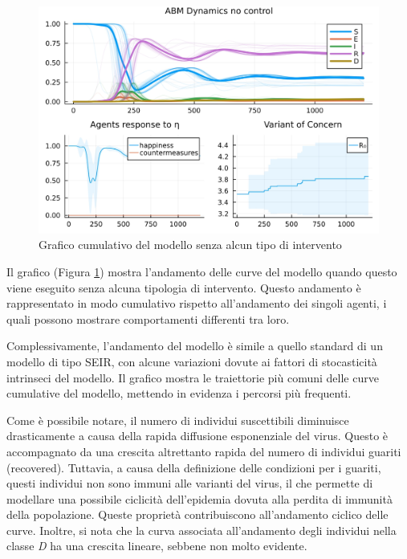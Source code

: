 \begin{figure}[H]
    \begin{center}
		\includegraphics[width=\textwidth]{img/SocialNetworkABM_NO_CONTROL.jpg}
		\caption{Grafico cumulativo del modello senza alcun tipo di intervento}
		\label{fig:abm_no_intervent}
	\end{center}
\end{figure}

Il grafico (Figura \ref{fig:abm_no_intervent}) mostra 
l'andamento delle curve del modello quando questo viene eseguito 
senza alcuna tipologia di intervento. Questo andamento è rappresentato 
in modo cumulativo rispetto all'andamento dei singoli agenti, 
i quali possono mostrare comportamenti differenti tra loro.

Complessivamente, l'andamento del modello è simile a quello 
standard di un modello di tipo SEIR, con alcune variazioni 
dovute ai fattori di stocasticità intrinseci del modello. 
Il grafico mostra le traiettorie più comuni delle curve cumulative 
del modello, mettendo in evidenza i percorsi più frequenti.

Come è possibile notare, il numero di individui suscettibili 
diminuisce drasticamente a causa della rapida diffusione 
esponenziale del virus. Questo è accompagnato da una crescita 
altrettanto rapida del numero di individui guariti (recovered). 
Tuttavia, a causa della definizione delle condizioni per i guariti, 
questi individui non sono immuni alle varianti del virus, il che 
permette di modellare una possibile ciclicità dell'epidemia 
dovuta alla perdita di immunità della popolazione. 
Queste proprietà contribuiscono all'andamento ciclico delle curve. 
Inoltre, si nota che la curva associata all'andamento degli 
individui nella classe \emph{D} ha una crescita lineare, 
sebbene non molto evidente.

